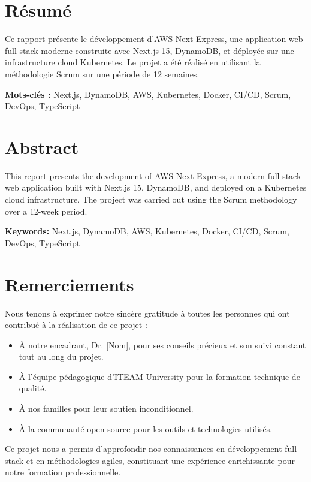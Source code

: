 \newpage
\chapter*{Résumé}

Ce rapport présente le développement d'AWS Next Express, une application web full-stack moderne construite avec Next.js 15, DynamoDB, et déployée sur une infrastructure cloud Kubernetes. Le projet a été réalisé en utilisant la méthodologie Scrum sur une période de 12 semaines.

\textbf{Mots-clés :} Next.js, DynamoDB, AWS, Kubernetes, Docker, CI/CD, Scrum, DevOps, TypeScript

\chapter*{Abstract}

This report presents the development of AWS Next Express, a modern full-stack web application built with Next.js 15, DynamoDB, and deployed on a Kubernetes cloud infrastructure. The project was carried out using the Scrum methodology over a 12-week period.

\textbf{Keywords:} Next.js, DynamoDB, AWS, Kubernetes, Docker, CI/CD, Scrum, DevOps, TypeScript

\chapter*{Remerciements}

Nous tenons à exprimer notre sincère gratitude à toutes les personnes qui ont contribué à la réalisation de ce projet :

\begin{itemize}
    \item À notre encadrant, Dr. [Nom], pour ses conseils précieux et son suivi constant tout au long du projet.
    \item À l'équipe pédagogique d'ITEAM University pour la formation technique de qualité.
    \item À nos familles pour leur soutien inconditionnel.
    \item À la communauté open-source pour les outils et technologies utilisés.
\end{itemize}

Ce projet nous a permis d'approfondir nos connaissances en développement full-stack et en méthodologies agiles, constituant une expérience enrichissante pour notre formation professionnelle. 